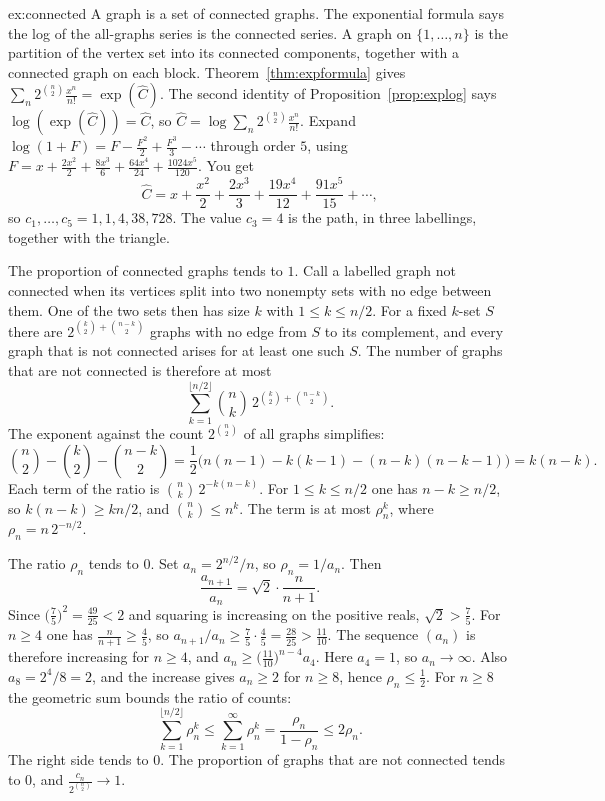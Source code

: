\begin{solution}{ex:connected}
\idea A graph is a set of connected graphs. The exponential formula says the log of the all-graphs series is the connected series.
\writeup A graph on $\{1,\dots,n\}$ is the partition of the vertex set into its connected components, together with a
connected graph on each block. Theorem~\ref{thm:expformula} gives $\sum_n2^{\binom n2}\frac{x^n}{n!}=\exp(\hat C)$. The second identity of Proposition~\ref{prop:explog} says $\log(\exp(\hat C))=\hat C$, so $\hat C=\log\sum_n2^{\binom n2}\frac{x^n}{n!}$.
Expand $\log(1+F)=F-\frac{F^2}2+\frac{F^3}3-\cdots$ through order $5$, using $F=x+\frac{2x^2}2+\frac{8x^3}6+\frac{64x^4}{24}+\frac{1024x^5}{120}$. You get
\[
\hat C=x+\frac{x^2}2+\frac{2x^3}3+\frac{19x^4}{12}+\frac{91x^5}{15}+\cdots,
\]
so $c_1,\dots,c_5=1,1,4,38,728$. The value $c_3=4$ is the path, in three labellings, together with the triangle.

The proportion of connected graphs tends to $1$. Call a labelled graph not connected when its vertices split into two nonempty sets with no edge between them. One of the two sets then has size $k$ with $1\le k\le n/2$. For a fixed $k$-set $S$ there are $2^{\binom k2+\binom{n-k}2}$ graphs with no edge from $S$ to its complement, and every graph that is not connected arises for at least one such $S$. The number of graphs that are not connected is therefore at most
\[
\sum_{k=1}^{\lfloor n/2\rfloor}\binom nk\,2^{\binom k2+\binom{n-k}2}.
\]
The exponent against the count $2^{\binom n2}$ of all graphs simplifies:
\[
\binom n2-\binom k2-\binom{n-k}2=\frac12\bigl(n(n-1)-k(k-1)-(n-k)(n-k-1)\bigr)=k(n-k).
\]
Each term of the ratio is $\binom nk\,2^{-k(n-k)}$. For $1\le k\le n/2$ one has $n-k\ge n/2$, so $k(n-k)\ge kn/2$, and $\binom nk\le n^k$. The term is at most $\rho_n^k$, where $\rho_n=n\,2^{-n/2}$.

The ratio $\rho_n$ tends to $0$. Set $a_n=2^{n/2}/n$, so $\rho_n=1/a_n$. Then
\[
\frac{a_{n+1}}{a_n}=\sqrt2\cdot\frac n{n+1}.
\]
Since $\bigl(\frac75\bigr)^2=\frac{49}{25}<2$ and squaring is increasing on the positive reals, $\sqrt2>\frac75$. For $n\ge4$ one has $\frac n{n+1}\ge\frac45$, so $a_{n+1}/a_n\ge\frac75\cdot\frac45=\frac{28}{25}>\frac{11}{10}$. The sequence $(a_n)$ is therefore increasing for $n\ge4$, and $a_n\ge\bigl(\frac{11}{10}\bigr)^{n-4}a_4$. Here $a_4=1$, so $a_n\to\infty$. Also $a_8=2^4/8=2$, and the increase gives $a_n\ge2$ for $n\ge8$, hence $\rho_n\le\frac12$. For $n\ge8$ the geometric sum bounds the ratio of counts:
\[
\sum_{k=1}^{\lfloor n/2\rfloor}\rho_n^k\le\sum_{k=1}^\infty\rho_n^k=\frac{\rho_n}{1-\rho_n}\le2\rho_n.
\]
The right side tends to $0$. The proportion of graphs that are not connected tends to $0$, and $\frac{c_n}{2^{\binom n2}}\to1$.
\end{solution}

